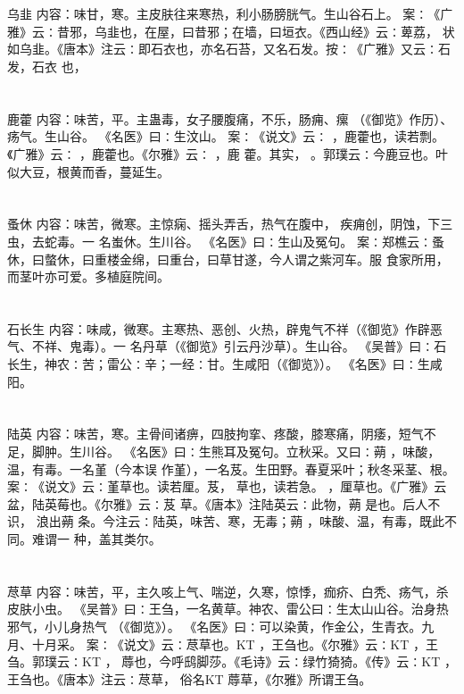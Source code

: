 \documentclass[12pt,UTF8]{ctexbook}
\begin{document}
\section{}乌韭
内容：味甘，寒。主皮肤往来寒热，利小肠膀胱气。生山谷石上。 
案∶《广雅》云∶昔邪，乌韭也，在屋，曰昔邪；在墙，曰垣衣。《西山经》云∶萆荔， 
状如乌韭。《唐本》注云∶即石衣也，亦名石苔，又名石发。按∶《广雅》又云∶石发，石衣 
也， 


\section{}鹿藿
内容：味苦，平。主蛊毒，女子腰腹痛，不乐，肠痈、瘰 （《御览》作历）、疡气。生山谷。 
《名医》曰∶生汶山。 
案∶《说文》云∶ ，鹿藿也，读若剽。《广雅》云∶ ，鹿藿也。《尔雅》云∶ ，鹿 
藿。其实， 。郭璞云∶今鹿豆也。叶似大豆，根黄而香，蔓延生。 


\section{}蚤休
内容：味苦，微寒。主惊痫、摇头弄舌，热气在腹中， 疾痈创，阴蚀，下三虫，去蛇毒。一 
名蚩休。生川谷。 
《名医》曰∶生山及冤句。 
案∶郑樵云∶蚤休，曰螫休，曰重楼金绵，曰重台，曰草甘遂，今人谓之紫河车。服 
食家所用，而茎叶亦可爱。多植庭院间。 


\section{}石长生
内容：味咸，微寒。主寒热、恶创、火热，辟鬼气不祥（《御览》作辟恶气、不祥、鬼毒）。一 
名丹草（《御览》引云丹沙草）。生山谷。 
《吴普》曰∶石长生，神农∶苦；雷公∶辛；一经∶甘。生咸阳（《御览》）。 
《名医》曰∶生咸阳。 


\section{}陆英
内容：味苦，寒。主骨间诸痹，四肢拘挛、疼酸，膝寒痛，阴痿，短气不足，脚肿。生川谷。 
《名医》曰∶生熊耳及冤句。立秋采。又曰∶蒴 ，味酸，温，有毒。一名堇（今本误 
作堇），一名芨。生田野。春夏采叶；秋冬采茎、根。 
案∶《说文》云∶堇草也。读若厘。芨， 草也，读若急。 ，厘草也。《广雅》云 
盆，陆英莓也。《尔雅》云∶芨 草。《唐本》注陆英云∶此物，蒴 是也。后人不识， 
浪出蒴 条。今注云∶陆英，味苦、寒，无毒；蒴 ，味酸、温，有毒，既此不同。难谓一 
种，盖其类尔。 


\section{}荩草
内容：味苦，平，主久咳上气、喘逆，久寒，惊悸，痂疥、白秃、疡气，杀皮肤小虫。 
《吴普》曰∶王刍，一名黄草。神农、雷公曰∶生太山山谷。治身热邪气，小儿身热气 
（《御览》）。 
《名医》曰∶可以染黄，作金公，生青衣。九月、十月采。 
案∶《说文》云∶荩草也。KT ，王刍也。《尔雅》云∶KT ，王刍。郭璞云∶KT ， 
蓐也，今呼鸱脚莎。《毛诗》云∶绿竹猗猗。《传》云∶KT ，王刍也。《唐本》注云∶荩草， 
俗名KT 蓐草，《尔雅》所谓王刍。 
\end{document}
